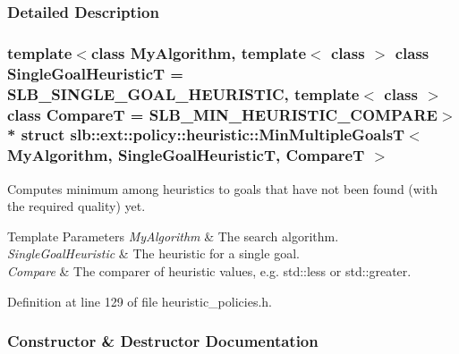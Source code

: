 \subsubsection{Detailed Description}
\subsubsection*{template$<$class My\+Algorithm, template$<$ class $>$ class Single\+Goal\+HeuristicT = S\+L\+B\+\_\+\+S\+I\+N\+G\+L\+E\+\_\+\+G\+O\+A\+L\+\_\+\+H\+E\+U\+R\+I\+S\+T\+IC, template$<$ class $>$ class CompareT = S\+L\+B\+\_\+\+M\+I\+N\+\_\+\+H\+E\+U\+R\+I\+S\+T\+I\+C\+\_\+\+C\+O\+M\+P\+A\+RE$>$\\*
struct slb\+::ext\+::policy\+::heuristic\+::\+Min\+Multiple\+Goals\+T$<$ My\+Algorithm, Single\+Goal\+Heuristic\+T, Compare\+T $>$}

Computes minimum among heuristics to goals that have not been found (with the required quality) yet. 


\begin{DoxyTemplParams}{Template Parameters}
{\em My\+Algorithm} & The search algorithm. \\
\hline
{\em Single\+Goal\+Heuristic} & The heuristic for a single goal. \\
\hline
{\em Compare} & The comparer of heuristic values, e.\+g. std\+::less or std\+::greater. \\
\hline
\end{DoxyTemplParams}


Definition at line 129 of file heuristic\+\_\+policies.\+h.



\subsubsection{Constructor \& Destructor Documentation}
